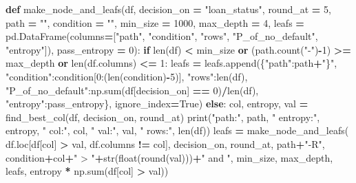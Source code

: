 \documentclass[
]{book}
\newenvironment{Shaded}{\begin{snugshade}}{\end{snugshade}}
\newcommand{\BuiltInTok}[1]{#1}
\newcommand{\ControlFlowTok}[1]{\textcolor[rgb]{0.13,0.29,0.53}{\textbf{#1}}}
\newcommand{\DecValTok}[1]{\textcolor[rgb]{0.00,0.00,0.81}{#1}}
\newcommand{\KeywordTok}[1]{\textcolor[rgb]{0.13,0.29,0.53}{\textbf{#1}}}
\newcommand{\NormalTok}[1]{#1}
\newcommand{\OperatorTok}[1]{\textcolor[rgb]{0.81,0.36,0.00}{\textbf{#1}}}
\newcommand{\StringTok}[1]{\textcolor[rgb]{0.31,0.60,0.02}{#1}}
\newcommand{\VariableTok}[1]{\textcolor[rgb]{0.00,0.00,0.00}{#1}}
\begin{document}
\begin{Shaded}
\begin{Highlighting}[]
\KeywordTok{def}\NormalTok{ make\_node\_and\_leafs(df, decision\_on }\OperatorTok{=} \StringTok{"loan\_status"}\NormalTok{, round\_at }\OperatorTok{=} \DecValTok{5}\NormalTok{, path }\OperatorTok{=} \StringTok{""}\NormalTok{, condition }\OperatorTok{=} \StringTok{""}\NormalTok{, min\_size }\OperatorTok{=} \DecValTok{1000}\NormalTok{, max\_depth }\OperatorTok{=} \DecValTok{4}\NormalTok{, leafs }\OperatorTok{=}\NormalTok{ pd.DataFrame(columns}\OperatorTok{=}\NormalTok{[}\StringTok{"path"}\NormalTok{, }\StringTok{"condition"}\NormalTok{, }\StringTok{"rows"}\NormalTok{, }\StringTok{"P\_of\_no\_default"}\NormalTok{, }\StringTok{"entropy"}\NormalTok{]), pass\_entropy }\OperatorTok{=} \DecValTok{0}\NormalTok{):}
  \ControlFlowTok{if} \BuiltInTok{len}\NormalTok{(df) }\OperatorTok{\textless{}}\NormalTok{ min\_size }\KeywordTok{or}\NormalTok{ (path.count(}\StringTok{"{-}"}\NormalTok{)}\OperatorTok{{-}}\DecValTok{1}\NormalTok{) }\OperatorTok{\textgreater{}=}\NormalTok{ max\_depth }\KeywordTok{or} \BuiltInTok{len}\NormalTok{(df.columns) }\OperatorTok{\textless{}=} \DecValTok{1}\NormalTok{:}
\NormalTok{    leafs }\OperatorTok{=}\NormalTok{ leafs.append(\{}\StringTok{"path"}\NormalTok{:path}\OperatorTok{+}\StringTok{"\}"}\NormalTok{, }\StringTok{"condition"}\NormalTok{:condition[}\DecValTok{0}\NormalTok{:(}\BuiltInTok{len}\NormalTok{(condition)}\OperatorTok{{-}}\DecValTok{5}\NormalTok{)], }\StringTok{"rows"}\NormalTok{:}\BuiltInTok{len}\NormalTok{(df), }\StringTok{"P\_of\_no\_default"}\NormalTok{:np.}\BuiltInTok{sum}\NormalTok{(df[decision\_on] }\OperatorTok{==} \DecValTok{0}\NormalTok{)}\OperatorTok{/}\BuiltInTok{len}\NormalTok{(df), }\StringTok{"entropy"}\NormalTok{:pass\_entropy\}, ignore\_index}\OperatorTok{=}\VariableTok{True}\NormalTok{)}
  \ControlFlowTok{else}\NormalTok{:}
\NormalTok{    col, entropy, val }\OperatorTok{=}\NormalTok{ find\_best\_col(df, decision\_on, round\_at)}
    \BuiltInTok{print}\NormalTok{(}\StringTok{"path:"}\NormalTok{, path, }\StringTok{"   entropy:"}\NormalTok{, entropy, }\StringTok{"  col:"}\NormalTok{, col, }\StringTok{"   val:"}\NormalTok{, val, }\StringTok{"  rows:"}\NormalTok{, }\BuiltInTok{len}\NormalTok{(df))}
\NormalTok{    leafs }\OperatorTok{=}\NormalTok{ make\_node\_and\_leafs( df.loc[df[col] }\OperatorTok{\textgreater{}}\NormalTok{ val, df.columns }\OperatorTok{!=}\NormalTok{ col], decision\_on, round\_at, path}\OperatorTok{+}\StringTok{"{-}R"}\NormalTok{, condition}\OperatorTok{+}\NormalTok{col}\OperatorTok{+}\StringTok{" \textgreater{} "}\OperatorTok{+}\BuiltInTok{str}\NormalTok{(}\BuiltInTok{float}\NormalTok{(}\BuiltInTok{round}\NormalTok{(val)))}\OperatorTok{+}\StringTok{" and "}\NormalTok{, min\_size, max\_depth, leafs, entropy }\OperatorTok{*}\NormalTok{ np.}\BuiltInTok{sum}\NormalTok{(df[col] }\OperatorTok{\textgreater{}}\NormalTok{ val))}

\end{Highlighting}
\end{Shaded}
\end{document}
